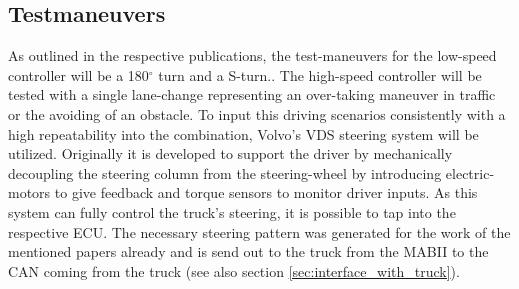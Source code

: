 \documentclass[ExampleMasters.tex]{subfiles}
\begin{document}
\subsection{Testmaneuvers}

As outlined in the respective publications, the test-maneuvers for the low-speed controller will be a 180$^{\circ}$ turn and a S-turn.\cite{Low-speed_paper}. The high-speed controller will be tested with a single lane-change representing an over-taking maneuver in traffic or the avoiding of an obstacle.\cite{High-speed_paper} To input this driving scenarios consistently with a high repeatability into the combination, Volvo's \gls{VDS} steering system will be utilized. Originally it is developed to support the driver by mechanically decoupling the steering column from the steering-wheel by introducing electric-motors to give feedback and torque sensors to monitor driver inputs. As this system can fully control the truck's steering, it is possible to tap into the respective \gls{ECU}. The necessary steering pattern was generated for the work of the mentioned papers already and is send out to the truck from the \gls{MABII} to the \gls{CAN} coming from the truck (see also section \ref{sec:interface_with_truck}).
\end{document}
